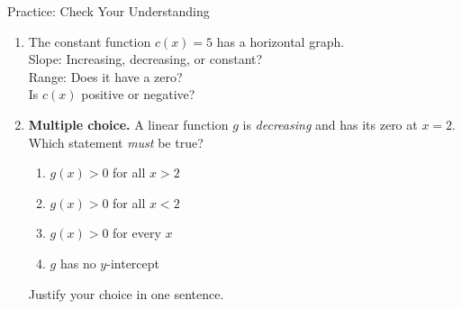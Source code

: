 \documentclass[12pt]{article}
\newcommand{\answerspace}[2]{\par\nopagebreak\noindent\begin{minipage}[t][#1][t]{\linewidth}%
  \color{keyred}\bfseries #2\end{minipage}\par}
\begin{document}
\begin{notesbox}{Practice: Check Your Understanding}
\begin{enumerate}[leftmargin=1.7em, itemsep=10pt]
  \item The constant function $c(x) = 5$ has a horizontal graph. \\[8pt]
        Slope: \blank{1.4cm} \qquad Increasing, decreasing, or constant? \blank{2.8cm} \\[8pt]
        Range: \blank{2.0cm} \qquad Does it have a zero? \blank{1.4cm} \\[8pt]
        Is $c(x)$ positive or negative? \blank{2.8cm}

  \item \textbf{Multiple choice.} A linear function $g$ is \emph{decreasing} and has its zero at
        $x=2$. Which statement \emph{must} be true?
    \begin{enumerate}[label=\Alph*., leftmargin=2.2em, itemsep=3pt]
      \item $g(x)>0$ for all $x>2$
      \item $g(x)>0$ for all $x<2$
      \item $g(x)>0$ for every $x$
      \item $g$ has no $y$-intercept
    \end{enumerate}
    Justify your choice in one sentence.
    \answerspace{1.6cm}{}
\end{enumerate}
\end{notesbox}
\end{document}
